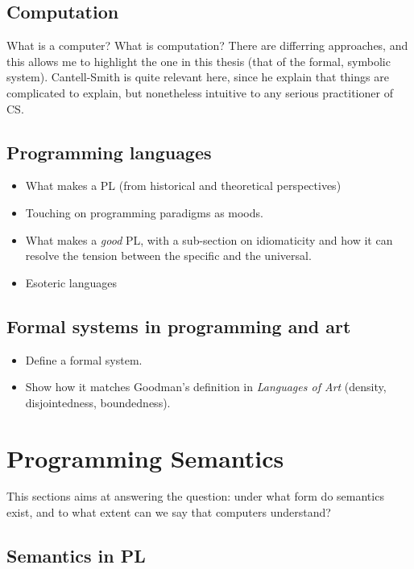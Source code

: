 \documentclass{article}
\begin{document}
\subsection{Computation}

What is a computer? What is computation? There are differring approaches, and this allows me to highlight the one in this thesis (that of the formal, symbolic system). Cantell-Smith is quite relevant here, since he explain that things are complicated to explain, but nonetheless intuitive to any serious practitioner of CS.

\subsection{Programming languages}

\begin{itemize}
  \item What makes a PL (from historical and theoretical perspectives)
  \item Touching on programming paradigms as moods.
  \item What makes a \emph{good} PL, with a sub-section on idiomaticity and how it can resolve the tension between the specific and the universal.
  \item Esoteric languages
\end{itemize}

\subsection{Formal systems in programming and art}

\begin{itemize}
  \item Define a formal system.
  \item Show how it matches Goodman's definition in \emph{Languages of Art} (density, disjointedness, boundedness).
\end{itemize}

\section{Programming Semantics}

This sections aims at answering the question: under what form do semantics exist, and to what extent can we say that computers understand?

\subsection{Semantics in PL}
\end{document}

